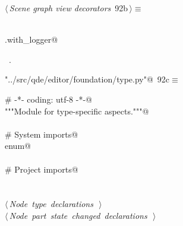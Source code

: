 \documentclass[
    a4paper,      %
    10pt,         %
    openright,    %
    notitlepage,  %
    parskip=half, %
]{scrreprt}       %
\theoremstyle{definition}                    %
\begin{document}
\begin{flushleft} \small
\begin{minipage}{\linewidth}\label{scrap147}\raggedright\small
{} $\langle\,${\itshape Scene graph view decorators}\nobreak\ {\footnotesize {92b}}$\,\rangle\equiv$
\vspace{-1exm}
\begin{list}{}{} \item
\mbox{}\lstinline@@\\
\mbox{}\lstinline@common.with_logger@\\
\mbox{}\lstinline@@{\NWsep}
\end{list}
\vspace{-1.5ex}
\footnotesize
\begin{list}{}{\setlength{\itemsep}{-\parsep}\setlength{\itemindent}{-\leftmargin}}
\item \NWtxtMacroRefIn\ .

\item{}
\end{list}
\end{minipage}\vspace{4ex}
\end{flushleft}
\begin{flushleft} \small
\begin{minipage}{\linewidth}\label{scrap148}\raggedright\small
{} \verb@"../src/qde/editor/foundation/type.py"@\nobreak\ {\footnotesize {92c}}$\equiv$
\vspace{-1ex}
\begin{list}{}{} \item
\mbox{}\lstinline@# -*- coding: utf-8 -*-@\\
\mbox{}\lstinline@"""Module for type-specific aspects."""@\\
\mbox{}\lstinline@@\\
\mbox{}\lstinline@# System imports@\\
\mbox{}\lstinline@import enum@\\
\mbox{}\lstinline@@\\
\mbox{}\lstinline@# Project imports@\\
\mbox{}\lstinline@@\\
\mbox{}\lstinline@@\\
\mbox{}\lstinline@@\hbox{$\langle\,${\itshape Node type declarations}\nobreak\ {\footnotesize {}}$\,\rangle$}\lstinline@@\\
\mbox{}\lstinline@@\hbox{$\langle\,${\itshape Node part state changed declarations}\nobreak\ {\footnotesize {}}$\,\rangle$}\lstinline@@\\
\mbox{}\lstinline@@{\NWsep}
\end{list}
\vspace{-1.5ex}
\footnotesize
\begin{list}{}{\setlength{\itemsep}{-\parsep}\setlength{\itemindent}{-\leftmargin}}

\item{}
\end{list}
\end{minipage}\vspace{4ex}
\end{flushleft}
\end{document}
